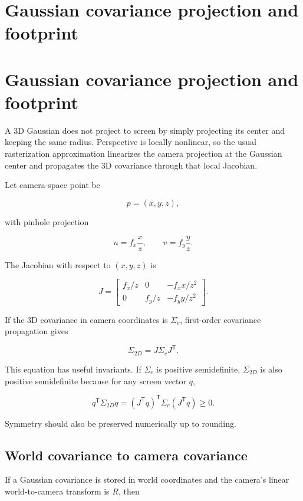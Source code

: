\hypertarget{appendix-24269cb6977c}{}
\section*{Gaussian covariance projection and footprint}
\section{Gaussian covariance projection and footprint}\label{appendix-24269cb6977c-gaussian-covariance-projection-and-footprint}

A 3D Gaussian does not project to screen by simply projecting its center and keeping the same radius. Perspective is locally nonlinear, so the usual rasterization approximation linearizes the camera projection at the Gaussian center and propagates the 3D covariance through that local Jacobian.

Let camera-space point be

\[
p=(x,y,z),
\]

with pinhole projection

\[
u=f_x\frac{x}{z},
\qquad
v=f_y\frac{y}{z}.
\]

The Jacobian with respect to \((x,y,z)\) is

\[
J=
\begin{bmatrix}
f_x/z & 0 & -f_xx/z^2\\
0 & f_y/z & -f_yy/z^2
\end{bmatrix}.
\]

If the 3D covariance in camera coordinates is \(\Sigma_c\), first-order covariance propagation gives

\[
\Sigma_{2D}=J\Sigma_cJ^{\mathsf T}.
\]

This equation has useful invariants. If \(\Sigma_c\) is positive semidefinite, \(\Sigma_{2D}\) is also positive semidefinite because for any screen vector \(q\),

\[
q^{\mathsf T}\Sigma_{2D}q
=
(J^{\mathsf T}q)^{\mathsf T}\Sigma_c(J^{\mathsf T}q)
\ge0.
\]

Symmetry should also be preserved numerically up to rounding.

\subsection{World covariance to camera covariance}\label{appendix-24269cb6977c-world-covariance-to-camera-covariance}

If a Gaussian covariance is stored in world coordinates and the camera's linear world-to-camera transform is \(R\), then

